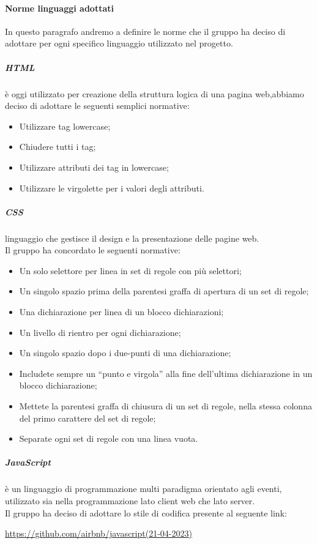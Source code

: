	\paragraph{Norme linguaggi adottati} 
 	In questo paragrafo andremo a definire le norme che il gruppo ha deciso di adottare per ogni specifico linguaggio utilizzato nel progetto.
	\subparagraph*{HTML} è oggi utilizzato per creazione della struttura logica di una pagina web,abbiamo 	 deciso di adottare le seguenti semplici normative:
	\begin{itemize}
	\item Utilizzare tag lowercase;
	\item Chiudere tutti i tag;
	\item Utilizzare attributi dei tag in lowercase;
	\item Utilizzare le virgolette per i valori degli attributi.
	\end{itemize}	
	
	\subparagraph*{CSS} linguaggio che gestisce il design e la presentazione delle pagine web. \\
	Il gruppo ha concordato le seguenti normative:
	\begin{itemize}
	\item Un solo selettore per linea in set di regole con più selettori;
	\item Un singolo spazio prima della parentesi graffa di apertura di un set di regole;
	\item Una dichiarazione per linea di un blocco dichiarazioni;
	\item  Un livello di rientro per ogni dichiarazione;
	\item Un singolo spazio dopo i due-punti di una dichiarazione;
	\item Includete sempre un “punto e virgola” alla fine dell'ultima dichiarazione in un blocco dichiarazione;
	\item Mettete la parentesi graffa di chiusura di un set di regole, nella stessa colonna del primo carattere del set di regole;
	\item Separate ogni set di regole con una linea vuota.
	\end{itemize}
	
	\subparagraph*{JavaScript}  è un linguaggio di programmazione multi paradigma orientato agli eventi, utilizzato sia nella programmazione lato client web che lato server. \\
Il gruppo ha deciso di adottare lo stile di codifica presente al seguente link:
\begin{center}
\href{https://github.com/airbnb/javascript}{https://github.com/airbnb/javascript(21-04-2023)}
\end{center}

